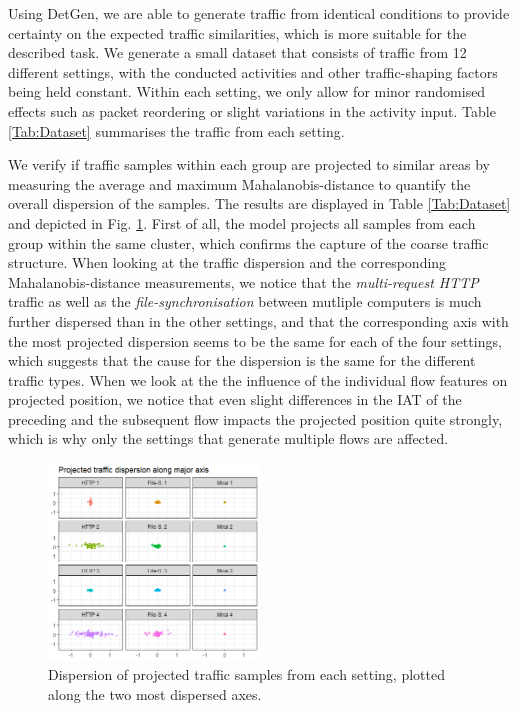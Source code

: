 \documentclass[conference]{IEEEtran}
\begin{document}
Using DetGen, we are able to generate traffic from identical conditions to provide certainty on the expected traffic similarities, which is more suitable for the described task. We generate a small dataset that consists of traffic from 12 different settings, with the conducted activities and other traffic-shaping factors being held constant. Within each setting, we only allow for minor randomised effects such as packet reordering or slight variations in the activity input. Table \ref{Tab:Dataset} summarises the traffic from each setting. 


We verify if traffic samples within each group are projected to similar areas by measuring the average and maximum Mahalanobis-distance to quantify the overall dispersion of the samples. The results are displayed in Table \ref{Tab:Dataset} and depicted in Fig. \ref{fig:Subspace_disp}. First of all, the model projects all samples from each group within the same cluster, which confirms the capture of the coarse traffic structure. When looking at the traffic dispersion and the corresponding Mahalanobis-distance measurements, we notice that the \textit{multi-request HTTP} traffic as well as the \textit{file-synchronisation} between mutliple computers is much further dispersed than in the other settings, and that the corresponding axis with the most projected dispersion seems to be the same for each of the four settings, which suggests that the cause for the dispersion is the same for the different traffic types. When we look at the the influence of the individual flow features on projected position, we notice that even slight differences in the IAT of the preceding and the subsequent flow impacts the projected position quite strongly, which is why only the settings that generate multiple flows are affected.


\begin{figure}
\centering
\includegraphics[width=0.5\textwidth]{images/traffic_dispersion.png}
\caption{Dispersion of projected traffic samples from each setting, plotted along the two most dispersed axes.}\label{fig:Subspace_disp}
\end{figure}
\end{document}
